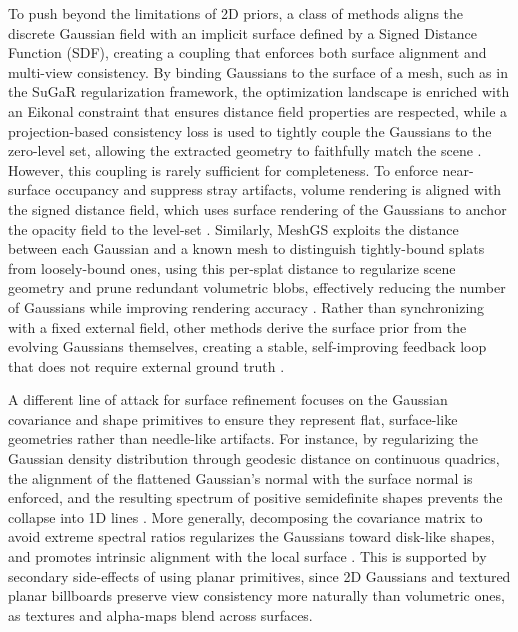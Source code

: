 \documentclass[11pt,a4paper]{article}
\begin{document}
To push beyond the limitations of 2D priors, a class of methods aligns the discrete Gaussian field with an implicit surface defined by a Signed Distance Function (SDF), creating a coupling that enforces both surface alignment and multi-view consistency. By binding Gaussians to the surface of a mesh, such as in the SuGaR regularization framework, the optimization landscape is enriched with an Eikonal constraint that ensures distance field properties are respected, while a projection-based consistency loss is used to tightly couple the Gaussians to the zero-level set, allowing the extracted geometry to faithfully match the scene \cite{arxiv:2311.12775v3}. However, this coupling is rarely sufficient for completeness. To enforce near-surface occupancy and suppress stray artifacts, volume rendering is aligned with the signed distance field, which uses surface rendering of the Gaussians to anchor the opacity field to the level-set \cite{arxiv:2404.10772v1}. Similarly, MeshGS exploits the distance between each Gaussian and a known mesh to distinguish tightly-bound splats from loosely-bound ones, using this per-splat distance to regularize scene geometry and prune redundant volumetric blobs, effectively reducing the number of Gaussians while improving rendering accuracy \cite{arxiv:2410.08941v1}. Rather than synchronizing with a fixed external field, other methods derive the surface prior from the evolving Gaussians themselves, creating a stable, self-improving feedback loop that does not require external ground truth \cite{arxiv:2401.03890v2}.

A different line of attack for surface refinement focuses on the Gaussian covariance and shape primitives to ensure they represent flat, surface-like geometries rather than needle-like artifacts. For instance, by regularizing the Gaussian density distribution through geodesic distance on continuous quadrics, the alignment of the flattened Gaussian's normal with the surface normal is enforced, and the resulting spectrum of positive semidefinite shapes prevents the collapse into 1D lines \cite{arxiv:2411.16392v4}. More generally, decomposing the covariance matrix to avoid extreme spectral ratios regularizes the Gaussians toward disk-like shapes, and promotes intrinsic alignment with the local surface \cite{arxiv:2403.17888v1}. This is supported by secondary side-effects of using planar primitives, since 2D Gaussians and textured planar billboards preserve view consistency more naturally than volumetric ones, as textures and alpha-maps blend across surfaces.
\end{document}
